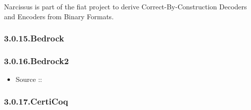 \documentclass[12pt,twoside]{article}
\begin{document}
\noindent{}Narcissus is part of the fiat project to derive
Correct-By-Construction Decoders and Encoders from Binary Formats.%

\subsubsection{3.0.15.\hspace*{0.5em}Bedrock}\label{sec-bedrock}%

\subsubsection{3.0.16.\hspace*{0.5em}Bedrock2}\label{sec-bedrock2}%

\begin{itemize}[noitemsep,topsep=\mdcompacttopsep]%

\item{}Source ::%
\end{itemize}%

\subsubsection{3.0.17.\hspace*{0.5em}CertiCoq}\label{sec-certicoq}%
\end{document}
